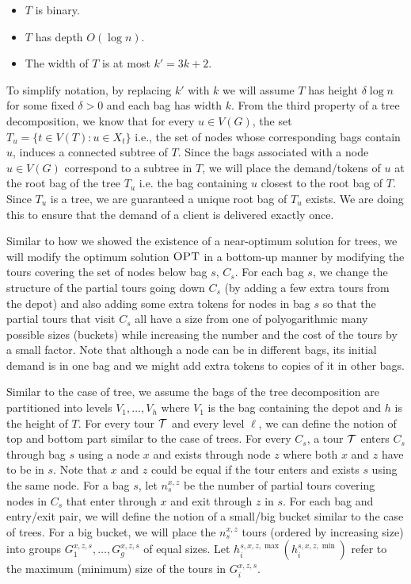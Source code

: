 \documentclass[twoside,leqno]{article}
\newcommand{\calT}{{\cal T}}
\newcommand{\OPT}{\mbox{\sc OPT}}
\begin{document}
\begin{itemize}
    \item $T$ is binary. 
    \item $T$ has depth $O(\log n)$. 
    \item The width of $T$ is at most $k'=3k + 2$. 
\end{itemize}
To simplify  notation, by replacing $k'$ with $k$
we will assume $T$ has height $\delta \log n$ for some fixed $\delta > 0$ and each bag has width $k$. From the third property of a tree decomposition, we know that for every $u \in V(G)$, the set $T_u = \{t \in V(T) : u \in X_t \}$ i.e., the set of nodes whose corresponding bags contain $u$, induces a connected subtree of $T$. Since the bags associated with a node $u \in V(G)$ correspond to a subtree in $T$, we will place the demand/tokens of $u$ at the root bag of the tree $T_u$ i.e. the bag containing $u$ closest to the root bag of $T$. Since $T_u$ is a tree, we are guaranteed a unique root bag of $T_u$ exists. We are doing this to ensure that the demand of a client is delivered exactly once. 

Similar to how we showed the existence of a near-optimum solution for trees, we will modify the optimum solution $\OPT$ in a bottom-up manner by modifying the tours covering the set of nodes below bag $s$, $C_s$. For each bag $s$, we change the structure of the partial tours going down $C_s$ (by adding a few extra tours from the depot) and also adding some extra tokens for nodes in bag $s$ so that the partial tours that visit $C_s$ all have a size from one of polyogarithmic many possible sizes (buckets) while increasing the number and the cost of the tours by a small factor. Note that although a node can be in different bags, its initial demand is in one bag and we might add extra tokens to copies of it in other bags. 

Similar to the case of tree, we assume the bags of the tree decomposition are partitioned into levels $V_1,\ldots,V_h$ where $V_1$ is the bag containing the depot and $h$ is the height of $T$.  For every tour $\calT$ and every level $\ell$, we can define the notion of top and bottom part similar to the case of trees. For every $C_s$, a tour $\calT$ enters $C_s$ through bag $s$ using a node $x$ and exists through node $z$ where both $x$ and $z$ have to be in $s$. Note that $x$ and $z$ could be equal if the tour enters and exists $s$ using the same node. For a bag $s$, let $n_{s}^{x,z}$ be the number of partial tours covering nodes in $C_s$ that enter through $x$ and exit through $z$ in $s$. For each bag and entry/exit pair, we will define the notion of a small/big bucket similar to the case of trees. For a big bucket, we will place the $n_{s}^{x,z}$ tours (ordered by increasing size) into groups $G_1^{x,z,s}, \ldots, G_g^{x,z,s}$ of equal sizes. Let $h_{i}^{s,x,z, \max} (h_{i}^{s,x,z, \min}) $ refer to the maximum (minimum) size of the tours in $G^{x,z,s}_i$.
\end{document}
